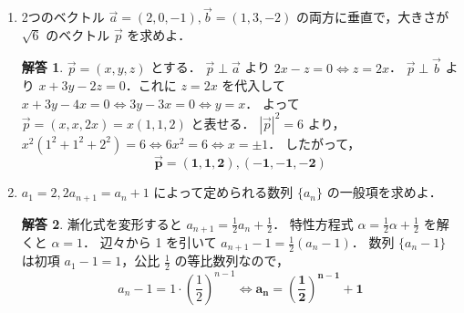 \documentclass[dvipdfmx]{jlreq}
\theoremstyle{definition}
\newtheorem*{solution}{解答}
\begin{document}
\begin{enumerate}[label=(\arabic*)]
\vspace{5mm}

    \item 2つのベクトル $\vec{a}=(2,0,-1), \vec{b}=(1,3,-2)$ の両方に垂直で，大きさが $\sqrt{6}$ のベクトル $\vec{p}$ を求めよ．
    \begin{solution}
    $\vec{p} = (x, y, z)$ とする．
    $\vec{p} \perp \vec{a}$ より $2x - z = 0 \iff z = 2x$．
    $\vec{p} \perp \vec{b}$ より $x + 3y - 2z = 0$．これに $z=2x$ を代入して $x + 3y - 4x = 0 \iff 3y-3x = 0 \iff y = x$．
    よって $\vec{p} = (x, x, 2x) = x(1, 1, 2)$ と表せる．
    $|\vec{p}|^2 = 6$ より，$x^2(1^2 + 1^2 + 2^2) = 6 \iff 6x^2 = 6 \iff x = \pm 1$．
    したがって，
    \[ \bm{\vec{p} = (1, 1, 2), (-1, -1, -2)} \]
    \end{solution}

\newpage   

    \item $a_1=2, 2a_{n+1}=a_n+1$ によって定められる数列 $\{a_n\}$ の一般項を求めよ．
    \begin{solution}
    漸化式を変形すると $\displaystyle a_{n+1} = \frac{1}{2}a_n + \frac{1}{2}$．
    特性方程式 $\displaystyle \alpha = \frac{1}{2}\alpha + \frac{1}{2}$ を解くと $\alpha = 1$．
    辺々から 1 を引いて $\displaystyle a_{n+1} - 1 = \frac{1}{2}(a_n - 1)$．
    数列 $\{a_n - 1\}$ は初項 $a_1 - 1 = 1$，公比 $\displaystyle \frac{1}{2}$ の等比数列なので，
    \[ a_n - 1 = 1 \cdot \left(\frac{1}{2}\right)^{n-1} \iff \bm{a_n = \left(\frac{1}{2}\right)^{n-1} + 1} \]
    \end{solution}

\vspace{5mm}


\end{enumerate}
\end{document}
